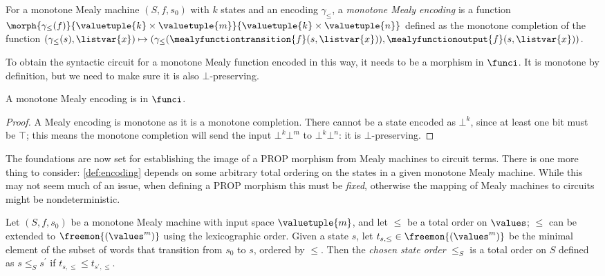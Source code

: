 \begin{definition}\label{def:mealy-encoding}
    For a monotone Mealy machine \((S, f, s_0)\) with \(k\) states and an
    encoding \(\gamma_\leq\), a \emph{monotone Mealy encoding} is a
    function
    \(
    \morph{
        \gamma_\leq(f)
    }{
        \valuetuple{k} \times \valuetuple{m}
    }{
        \valuetuple{k} \times \valuetuple{n}
    }
    \) defined as the monotone completion of the function \(
    (\gamma_\leq(s), \listvar{x})
    \mapsto
    (
    \gamma_\leq(\mealyfunctiontransition{f}(s, \listvar{x})),
    \mealyfunctionoutput{f}(s, \listvar{x})
    )
    \).
\end{definition}

To obtain the syntactic circuit for a monotone Mealy function encoded
in this way, it needs to be a morphism in \(\funci\).
It is monotone by definition, but we need to make sure it is also
\(\bot\)-preserving.

\begin{lemma}
    A monotone Mealy encoding is in \(\funci\).
\end{lemma}
\begin{proof}
    A Mealy encoding is monotone as it is a monotone completion.
    There cannot be a state encoded as \(\bot^k\), since at least one bit must
    be \(\top\); this means the monotone completion will send the input
    \(\bot^k\bot^m\) to \(\bot^k\bot^n\): it is
    \(\bot\)-preserving.
\end{proof}

The foundations are now set for establishing the image of a PROP morphism from
Mealy machines to circuit terms.
There is one more thing to consider: \cref{def:encoding} depends on some
arbitrary total ordering on the states in a given monotone Mealy machine.
While this may not seem much of an issue, when
defining a PROP morphism this must be \emph{fixed}, otherwise the mapping of
Mealy machines to circuits might be nondeterministic.

\begin{definition}
    Let \((S, f, s_0)\) be a monotone Mealy machine with input space
    \(\valuetuple{m}\), and let \(\leq\) be a total order on \(\values\);
    \(\leq\) can be extended to \(\freemon{(\values^m)}\) using the
    lexicographic order.
    Given a state \(s\), let \(t_{s,\leq} \in \freemon{(\values^m)}\) be
    the minimal element of the subset of words that transition from \(s_0\) to
    \(s\), ordered by \(\leq\).
    Then the \emph{chosen state order} \(\leq_S\) is a total order on \(S\)
    defined as \(s \leq_S s^\prime\) if \(t_{s,\leq} \leq t_{s^\prime,\leq}\).
\end{definition}

